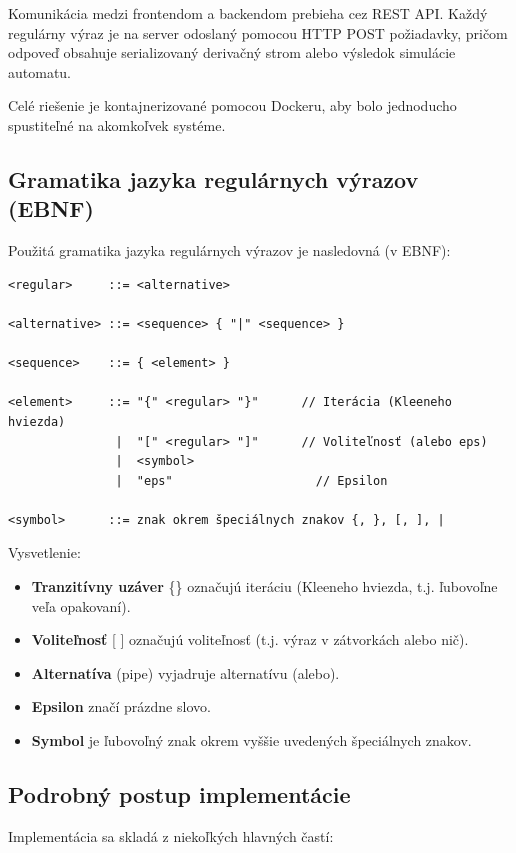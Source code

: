 \documentclass[a4paper,12pt]{article}
\begin{document}
Komunikácia medzi frontendom a backendom prebieha cez REST API. Každý regulárny výraz je na server odoslaný pomocou HTTP POST požiadavky, pričom odpoveď obsahuje serializovaný derivačný strom alebo výsledok simulácie automatu.

Celé riešenie je kontajnerizované pomocou Dockeru, aby bolo jednoducho spustiteľné na akomkoľvek systéme.

\subsection{Gramatika jazyka regulárnych výrazov (EBNF)}

Použitá gramatika jazyka regulárnych výrazov je nasledovná (v EBNF):

\begin{verbatim}
<regular>     ::= <alternative>

<alternative> ::= <sequence> { "|" <sequence> }

<sequence>    ::= { <element> }

<element>     ::= "{" <regular> "}"      // Iterácia (Kleeneho hviezda)
               |  "[" <regular> "]"      // Voliteľnosť (alebo eps)
               |  <symbol>
               |  "eps"                    // Epsilon

<symbol>      ::= znak okrem špeciálnych znakov {, }, [, ], |

\end{verbatim}

Vysvetlenie:
\begin{itemize}
    \item \textbf{Tranzitívny uzáver} \{\} označujú iteráciu (Kleeneho hviezda, t.j. ľubovoľne veľa opakovaní).
    \item \textbf{Voliteľnosť} [ ] označujú voliteľnosť (t.j. výraz v zátvorkách alebo nič).
    \item \textbf{Alternatíva} \textbar{} (pipe) vyjadruje alternatívu (alebo).
    \item \textbf{Epsilon} značí prázdne slovo.
    \item \textbf{Symbol} je ľubovoľný znak okrem vyššie uvedených špeciálnych znakov.
\end{itemize}

\subsection{Podrobný postup implementácie}

Implementácia sa skladá z niekoľkých hlavných častí:
\end{document}
